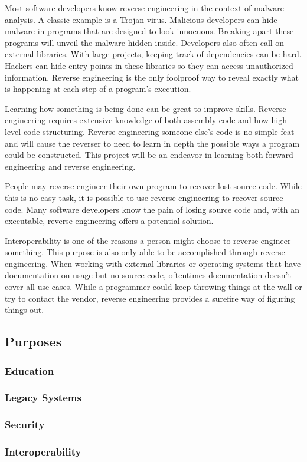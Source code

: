  Most software developers know reverse engineering in the context of malware analysis. 
 A classic example is a Trojan virus. Malicious developers can hide malware in programs that are designed to look innocuous. 
 Breaking apart these programs will unveil the malware hidden inside. Developers also often call on external libraries. 
 With large projects, keeping track of dependencies can be hard. Hackers can hide entry points in these libraries so they can access unauthorized information. 
 Reverse engineering is the only foolproof way to reveal exactly what is happening at each step of a program’s execution.

Learning how something is being done can be great to improve skills. 
Reverse engineering requires extensive knowledge of both assembly code and how high level code structuring. 
Reverse engineering someone else's code is no simple feat and will cause the reverser to need to learn in depth the possible ways a program could be constructed. 
This project will be an endeavor in learning both forward engineering and reverse engineering.  

People may reverse engineer their own program to recover lost source code. 
While this is no easy task, it is possible to use reverse engineering to recover source code. 
Many software developers know the pain of losing source code and, with an executable, reverse engineering offers a potential solution.

Interoperability is one of the reasons a person might choose to reverse engineer something. 
This purpose is also only able to be accomplished through reverse engineering. 
When working with external libraries or operating systems that have documentation on usage but no source code, oftentimes documentation doesn’t cover all use cases. 
While a programmer could keep throwing things at the wall or try to contact the vendor, reverse engineering provides a surefire way of figuring things out.

\subsection{Purposes}
\subsubsection{Education}
\subsubsection{Legacy Systems}
\subsubsection{Security}
\subsubsection{Interoperability}
